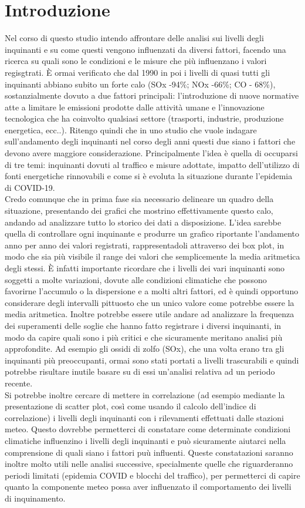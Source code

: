 \documentclass{article}
\begin{document}
\section{Introduzione}
Nel corso di questo studio intendo affrontare delle analisi sui livelli degli inquinanti e su come questi vengono influenzati da diversi fattori, facendo una ricerca su quali sono le condizioni e le misure che più influenzano i valori regisgtrati. È ormai verificato che dal 1990 in poi i livelli di quasi tutti gli inquinanti abbiano subito un forte calo (SOx -94\%; NOx -66\%; CO -
68\%), sostanzialmente dovuto a due fattori principali: l'introduzione di nuove normative atte a limitare le emissioni prodotte dalle attività umane e l'innovazione tecnologica che ha coinvolto qualsiasi settore (trasporti, industrie, produzione energetica, ecc..). Ritengo quindi che in uno studio che vuole indagare sull'andamento degli inquinanti nel corso degli anni questi due siano i fattori che devono avere maggiore considerazione. Principalmente l'idea è quella di occuparsi di tre temi: inquinanti dovuti al traffico e misure adottate, impatto dell'utilizzo di fonti energetiche rinnovabili e come si è evoluta la situazione durante l'epidemia di COVID-19.
\\Credo comunque che in prima fase sia necessario delineare un quadro della situazione, presentando dei grafici che mostrino effettivamente questo calo, andando ad analizzare tutto lo storico dei dati a disposizione. L'idea sarebbe quella di controllare ogni inquinante e produrre un grafico riportante l'andamento anno per anno dei valori registrati, rappresentadoli attraverso dei box plot, in modo che sia più visibile il range dei valori che semplicemente la media aritmetica degli stessi. È infatti importante ricordare che i livelli dei vari inquinanti sono soggetti a molte variazioni, dovute alle condizioni climatiche che possono favorirne l'accumulo o la dispersione e a molti altri fattori, ed è quindi opportuno considerare degli intervalli pittuosto che un unico valore come potrebbe essere la media aritmetica.
Inoltre potrebbe essere utile andare ad analizzare la frequenza dei superamenti delle soglie che hanno fatto registrare i diversi inquinanti, in modo da capire quali sono i più critici e che sicuramente meritano analisi più approfondite. Ad esempio gli ossidi di zolfo (SOx), che una volta erano tra gli inquinanti più preoccupanti, ormai sono stati portati a livelli trascurabili e quindi potrebbe risultare inutile basare su di essi un'analisi relativa ad un periodo recente.
\\Si potrebbe inoltre cercare di mettere in correlazione (ad esempio mediante la presentazione di scatter plot, così come usando il calcolo dell'indice di correlazione) i livelli degli inquinanti con i rilevamenti effettuati dalle stazioni meteo. Questo dovrebbe permetterci di constatare come determinate condizioni climatiche influenzino i livelli degli inquinanti e può sicuramente aiutarci nella comprensione di quali siano i fattori puù influenti. Queste constatazioni saranno inoltre molto utili nelle analisi successive, specialmente quelle che riguarderanno periodi limitati (epidemia COVID e blocchi del traffico), per permetterci di capire quanto la componente meteo possa aver influenzato il comportamento dei livelli di inquinamento.
\end{document}
